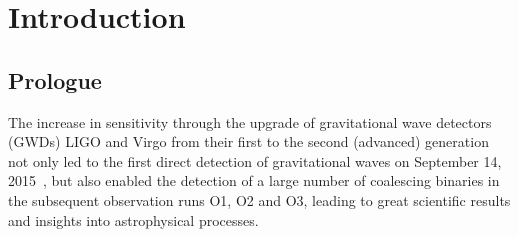 \chapter{Introduction}
\label{chap:Intro}

\section[Prologue]{Prologue}
\label{Prologue}

The increase in sensitivity through the upgrade of gravitational wave detectors (GWDs) LIGO and Virgo from their first to the second (advanced) generation not only led to the first direct detection of gravitational waves on September 14, 2015~\cite{Abbott:2016blz}, but also enabled the detection of a large number of coalescing binaries in the subsequent observation runs O1, O2 and O3, leading to great scientific results and insights into astrophysical processes. 

